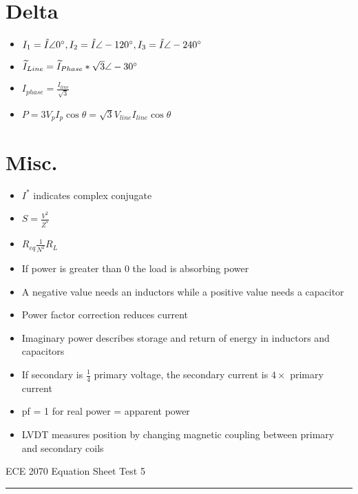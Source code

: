 \documentclass [12pt] {article}
\begin{document}
\begin{multicols*}{2}
\section{Delta}
	\begin{itemize}
		\item $I_1 = \tilde{I}\angle 0\degree, I_2 = \tilde{I}\angle -120\degree, I_3= \tilde{I}\angle -240\degree$ 
		\item $\widetilde{I}_{Line} = \widetilde{I}_{Phase}*\sqrt{3}\angle -30\degree$
		\item $I_{phase} = \frac{I_{line}}{\sqrt{3}}$
		\item $P = 3V_pI_p\cos\theta = \sqrt{3}V_{line}I_{line}\cos\theta$
	\end{itemize}
\section{Misc.}
	\begin{itemize}
		\item $I^*$ indicates complex conjugate
		\item $S = \frac{V^2}{Z^*}$
		\item $R_{eq} \frac{1}{N^2}R_L$
		\item If power is greater than 0 the load is absorbing power
		\item A negative value needs an inductors while a positive value needs a capacitor
		\item Power factor correction reduces current
		\item Imaginary power describes storage and return of energy in inductors and capacitors
		\item If secondary is $\frac{1}{4}$ primary voltage, the secondary current is $4\times$ primary current
		\item pf = 1 for real power = apparent power
		\item LVDT measures position by changing magnetic coupling between primary and secondary coils
	\end{itemize}
\end{multicols*}
\newpage
ECE 2070 Equation Sheet \hfill Test 5 \\
\rule{7.6in}{0.4pt}
\end{document}
